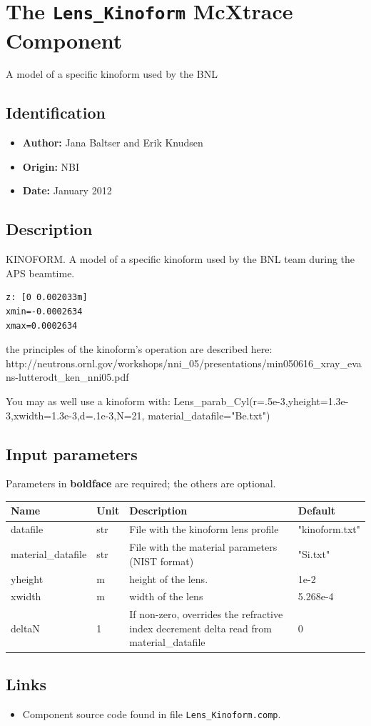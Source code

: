 \section{The \texttt{Lens\_Kinoform} McXtrace Component}
A model of a specific kinoform used by the BNL

\subsection*{Identification}
\begin{itemize}
  \item \textbf{Author:} Jana Baltser and Erik Knudsen
  \item \textbf{Origin:} NBI
  \item \textbf{Date:} January 2012
\end{itemize}

\subsection*{Description}
KINOFORM. A model of a specific kinoform used by the BNL team during the APS beamtime.

\begin{verbatim}
z: [0 0.002033m]
xmin=-0.0002634
xmax=0.0002634
\end{verbatim}

the principles of the kinoform's operation are described here: http://neutrons.ornl.gov/workshops/nni\_05/presentations/min050616\_xray\_evans-lutterodt\_ken\_nni05.pdf

You may as well use a kinoform with: Lens\_parab\_Cyl(r=.5e-3,yheight=1.3e-3,xwidth=1.3e-3,d=.1e-3,N=21, material\_datafile="Be.txt")

\subsection*{Input parameters}
Parameters in \textbf{boldface} are required; the others are optional.

\begin{longtable}{p{}p{}p{}p{}}
\toprule
\textbf{Name} & \textbf{Unit} & \textbf{Description} & \textbf{Default} \\
\midrule
\endhead
datafile & str & File with the kinoform lens profile & "kinoform.txt" \\
material\_datafile & str & File with the material parameters (NIST format) & "Si.txt" \\
yheight & m & height of the lens. & 1e-2 \\
xwidth & m & width of the lens & 5.268e-4 \\
deltaN & 1 & If non-zero, overrides the refractive index decrement delta read from material\_datafile & 0 \\
\bottomrule
\end{longtable}

\subsection*{Links}
\begin{itemize}
  \item Component source code found in file \texttt{Lens\_Kinoform.comp}.
\end{itemize}
